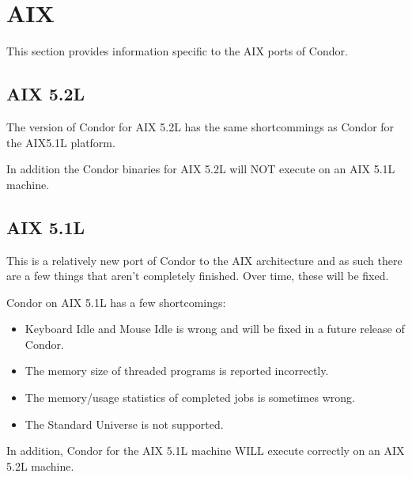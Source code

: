 \section{\label{sec:platform-aix}AIX}

This section provides information specific to the AIX ports of
Condor.

\subsection{\label{sec:platform-aix}AIX 5.2L}

The version of Condor for AIX 5.2L has the same shortcommings as Condor
for the AIX5.1L platform.

In addition the Condor binaries for AIX 5.2L will NOT execute on an
AIX 5.1L machine.

\subsection{\label{sec:platform-aix}AIX 5.1L}

This is a relatively new port of Condor to the AIX architecture and as such
there are a few things that aren't completely finished. Over time, these will
be fixed.

Condor on AIX 5.1L has a few shortcomings:
\begin{itemize}
\item Keyboard Idle and Mouse Idle is wrong and will be fixed in a future
	release of Condor.
\item The memory size of threaded programs is reported incorrectly.
\item The memory/usage statistics of completed jobs is sometimes wrong.
\item The Standard Universe is not supported.
\end{itemize}

In addition, Condor for the AIX 5.1L machine WILL execute correctly on an
AIX 5.2L machine.

